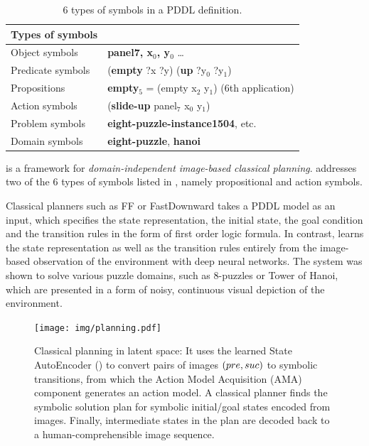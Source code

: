 \begin{table}[tbp] 
\centering
{}
\begin{tabular}{ll}
Types of symbols & \\
\hline
Object symbols    & \textbf{panel7, x\(_{\text{0}}\), y\(_{\text{0}}\)} \ldots{}               \\
Predicate symbols & (\textbf{empty} ?x ?y) (\textbf{up} ?y\(_{\text{0}}\) ?y\(_{\text{1}}\))   \\
Propositions      & \textbf{empty\(_{\text{5}}\)} = (empty x\(_{\text{2}}\) y\(_{\text{1}}\)) (6th application) \\
Action symbols    & (\textbf{slide-up} panel\(_{\text{7}}\) x\(_{\text{0}}\) y\(_{\text{1}}\)) \\
Problem symbols   & \textbf{eight-puzzle-instance1504}, etc.                                   \\
Domain  symbols   & \textbf{eight-puzzle}, \textbf{hanoi}                                      \\
\hline
\end{tabular}
\caption{6 types of symbols in a PDDL definition.}
\label{tab:type-of-symbols}
\end{table}

\textbf{\latentplanner} \cite{Asai2018} is a framework for
\emph{domain-independent image-based classical planning}.
\latentplanner addresses two of the 6 types of symbols listed in ,
namely propositional and action symbols.

Classical planners such as FF \cite{hoffmann01} or
FastDownward \cite{Helmert04} takes a PDDL model as an input, which
specifies the state representation, the initial state, the goal
condition and the transition rules in the form of first order logic
formula.  In contrast, \latentplanner learns the state representation as well as the transition rules
entirely from the image-based observation of the environment with deep neural networks.
The system was shown to solve various puzzle domains, such as 8-puzzles or Tower of Hanoi,
which are presented in a form of noisy, continuous visual depiction of the environment.

\begin{figure}[htb]
 \centering
 \texttt{[image: img/planning.pdf]}
 \caption{Classical planning in latent space:
It uses the learned State AutoEncoder () to convert pairs of images $(pre,suc)$ to symbolic transitions,
 from which the Action Model Acquisition (AMA) component generates an action model.
A classical planner finds the symbolic solution plan for symbolic initial/goal states encoded from images.
Finally, intermediate states in the plan are decoded back to a human-comprehensible image sequence.}
\label{fig:overview}
\end{figure}

